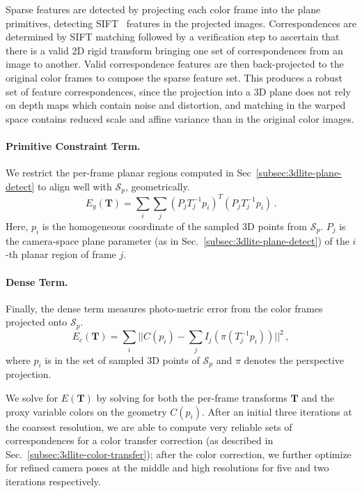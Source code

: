 Sparse features are detected by projecting each color frame into the plane primitives, detecting SIFT~\cite{lowe2004distinctive} features in the projected images.
Correspondences are determined by SIFT matching followed by a verification step to ascertain that there is a valid 2D rigid transform bringing one set of correspondences from an image to another.
Valid correspondence features are then back-projected to the original color frames to compose the sparse feature set. 
This produces a robust set of feature correspondences, since the projection into a 3D plane does not rely on depth maps which contain noise and distortion, and matching in the warped space contains reduced scale and affine variance than in the original color images.

\paragraph*{Primitive Constraint Term.}
We restrict the per-frame planar regions computed in Sec~\ref{subsec:3dlite-plane-detect} to align well with $\mathcal{S}_p$, geometrically.
\begin{equation}
E_g(\mathbf{T}) = \sum_{i} \sum_{j} (P_j T_j^{-1} p_i)^T (P_j T_j^{-1} p_i)\,.
\label{eq:pose-optim-geo}
\end{equation}
Here, $p_i$ is the homogeneous coordinate of the sampled 3D points from $\mathcal{S}_p$. $P_j$ is the camera-space plane parameter (as in Sec.~\ref{subsec:3dlite-plane-detect}) of the $i$-th planar region of frame $j$.

\paragraph*{Dense Term.} 
Finally, the dense term measures photo-metric error from the color frames projected onto $\mathcal{S}_p$.
\begin{equation}
E_c(\mathbf{T}) = \sum_{i} ||C(p_i) - \sum_j I_j(\pi(T_j^{-1}p_i))||^2\,,
\label{eq:pose-optim-color}
\end{equation} 
where $p_i$ is in the set of sampled 3D points of $\mathcal{S}_p$ and $\pi$ denotes the perspective projection.

We solve for $E(\mathbf{T})$ by solving for both the per-frame transforms $\mathbf{T}$ and the proxy variable colors on the geometry $C(p_i)$.
After an initial three iterations at the coarsest resolution, we are able to compute very reliable sets of correspondences for a color transfer correction (as described in Sec.~\ref{subsec:3dlite-color-transfer}); after the color correction, we further optimize for refined camera poses at the middle and high resolutions for five and two iterations respectively.

